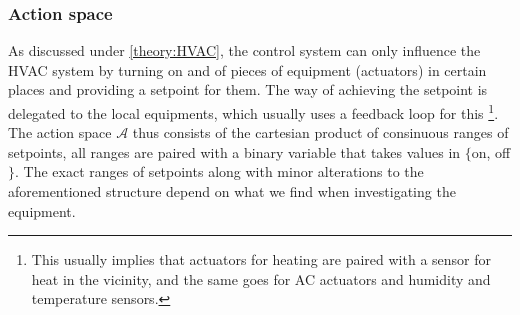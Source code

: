 \documentclass{article}
\theoremstyle{definition}
\theoremstyle{remark}
\newcommand{\act}{\mathcal{A}}
\begin{document}
\subsubsection{Action space}\label{MDP:actions}
As discussed under \ref{theory:HVAC}, the control system can only influence the HVAC system by turning on and of pieces of equipment (actuators) in certain places and providing a setpoint for them. The way of achieving the setpoint is delegated to the local equipments, which usually uses a feedback loop for this \footnote{This usually implies that actuators for heating are paired with a sensor for heat in the vicinity, and the same goes for AC actuators and humidity and temperature sensors.}. The action space $\act$ thus consists of the cartesian product of consinuous ranges of setpoints, all ranges are paired with a binary variable that takes values in $\{$on, off$\}$. The exact ranges of setpoints along with minor alterations to the aforementioned structure depend on what we find when investigating the equipment.
\end{document}
